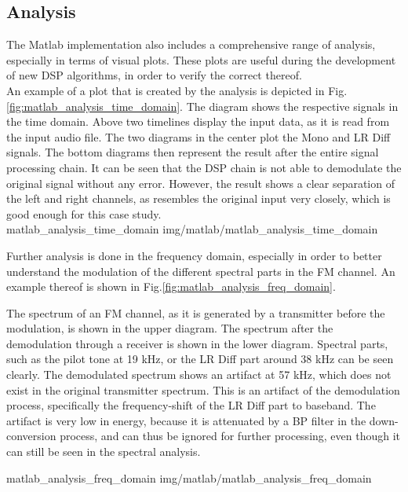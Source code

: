 \subsection{Analysis}

The Matlab implementation also includes a comprehensive range of analysis, especially in terms of visual plots.
These plots are useful during the development of new DSP algorithms, in order to verify the correct thereof.\\

An example of a plot that is created by the analysis is depicted in Fig.\ref{fig:matlab_analysis_time_domain}.
The diagram shows the respective signals in the time domain.
Above two timelines display the input data, as it is read from the input audio file.
The two diagrams in the center plot the Mono and LR Diff signals.
The bottom diagrams then represent the result after the entire signal processing chain.
It can be seen that the DSP chain is not able to demodulate the original signal without any error.
However, the result shows a clear separation of the left and right channels, as resembles the original input very closely, which is good enough for this case study.\\

 {matlab_analysis_time_domain} {img/matlab/matlab_analysis_time_domain}

Further analysis is done in the frequency domain, especially in order to better understand the modulation of the different spectral parts in the FM channel.
An example thereof is shown in Fig.\ref{fig:matlab_analysis_freq_domain}.

The spectrum of an FM channel, as it is generated by a transmitter before the modulation, is shown in the upper diagram.
The spectrum after the demodulation through a receiver is shown in the lower diagram.
Spectral parts, such as the pilot tone at 19 kHz, or the LR Diff part around 38 kHz can be seen clearly.
The demodulated spectrum shows an artifact at 57 kHz, which does not exist in the original transmitter spectrum.
This is an artifact of the demodulation process, specifically the frequency-shift of the LR Diff part to baseband.
The artifact is very low in energy, because it is attenuated by a BP filter in the down-conversion process, and can thus be ignored for further processing, even though it can still be seen in the spectral analysis.

 {matlab_analysis_freq_domain} {img/matlab/matlab_analysis_freq_domain}

